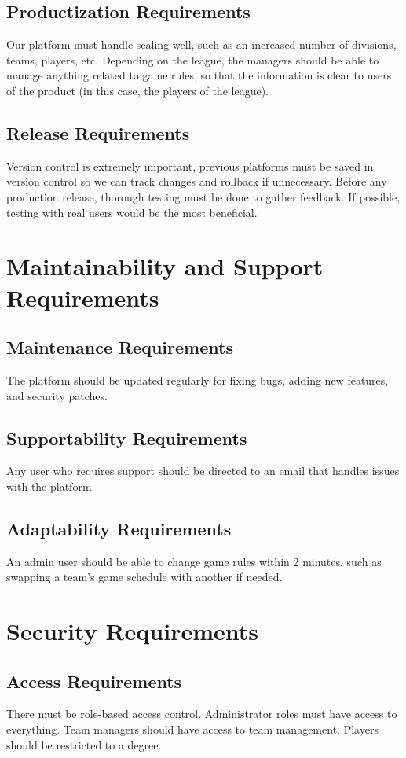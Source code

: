 \documentclass[12pt]{article}
\begin{document}
\subsection{Productization Requirements}
Our platform must handle scaling well, such as an increased number of divisions, teams, players, etc.
Depending on the league, the managers should be able to manage anything related to game rules, so that the information is clear to users of the product (in this case, the players of the league).

\subsection{Release Requirements}
Version control is extremely important, previous platforms must be saved in version control so we can track changes and rollback if unnecessary.
Before any production release, thorough testing must be done to gather feedback. If possible, testing with real users would be the most beneficial.

\section{Maintainability and Support Requirements}
\subsection{Maintenance Requirements}
The platform should be updated regularly for fixing bugs, adding new features, and security patches.

\subsection{Supportability Requirements}
Any user who requires support should be directed to an email that handles issues with the platform.

\subsection{Adaptability Requirements}
An admin user should be able to change game rules within 2 minutes, such as swapping a team’s game schedule with another if needed.

\section{Security Requirements}
\subsection{Access Requirements}
There must be role-based access control. Administrator roles must have access to everything. Team managers should have access to team management. Players should be restricted to a degree.
\end{document}
